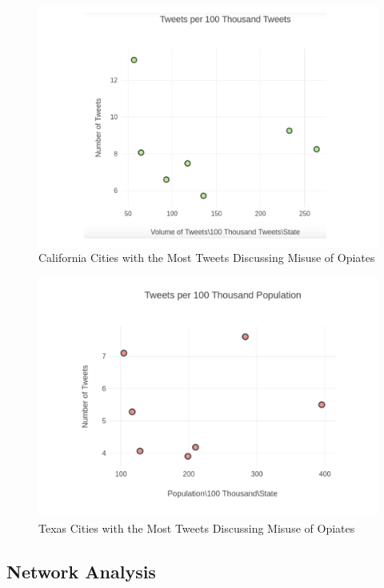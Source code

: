 \documentclass[sigconf]{acmart}
\begin{document}
\begin{figure}[!ht]
  \centering\includegraphics[width=\columnwidth]{images/Figure6.pdf}
  \caption{California Cities with the Most Tweets Discussing 
  Misuse of Opiates}
  \label{f:Figure5}
\end{figure}

\begin{figure}[!ht]
  \centering\includegraphics[width=\columnwidth]{images/Figure5.pdf}
  \caption{Texas Cities with the Most Tweets Discussing Misuse of Opiates}
  \label{f:Figure6}
\end{figure}



\subsection{Network Analysis} 
\end{document}

